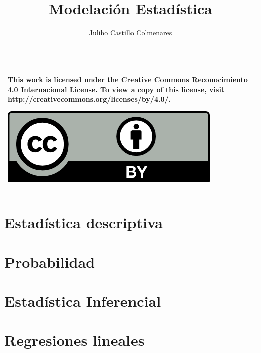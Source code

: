 \documentclass[
]{tufte-book}
\title{Modelación Estadística}
\author{Juliho Castillo Colmenares}
\begin{document}
	\maketitle
\begin{tabular}{|p{}|}
	\hline
	This work is licensed under the Creative Commons Reconocimiento 4.0 Internacional License. To view a copy of this license, visit
	http://creativecommons.org/licenses/by/4.0/.
	\begin{center}
		\includegraphics[scale=1]{./licencia/by.png}
	\end{center}\\
	\hline
\end{tabular}
\tableofcontents

\chapter{Estadística descriptiva}



\chapter{Probabilidad}





%






\chapter{Estadística Inferencial}








\chapter{Regresiones lineales}










\end{document}
